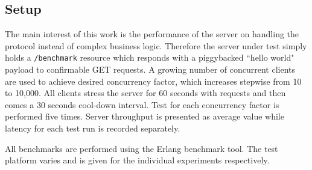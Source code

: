 



\subsection{Setup}

The main interest of this work is the performance of the server on handling the protocol instead of complex business logic. Therefore the server under test simply holds a \verb|/benchmark| resource which responds with a piggybacked ``hello world" payload to confirmable GET requests. A growing number of concurrent clients are used to achieve desired concurrency factor, which increases stepwise from 10 to 10,000. All clients stress the server for 60 seconds with requests and then comes a 30 seconds cool-down interval.  Test for each concurrency factor is performed five times. Server throughput is presented as average value while latency for each test run is recorded separately.

All benchmarks are performed using the Erlang benchmark tool. The test platform varies and is given for the individual experiments respectively.

